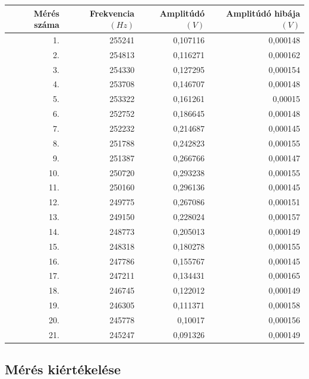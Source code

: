 \documentclass[10pt,pdftex]{report}
\begin{document}
\begin{centering}
    \centering
    \begin{tabular}{|r|r|r|r|}
        \hline
        Mérés száma & Frekvencia$(Hz)$ & Amplitúdó$(V)$ & Amplitúdó hibája$(V)$\\
        \hline
        1. & 255241 & 0,107116 & 0,000148 \\
        \hline
        2. & 254813 & 0,116271 & 0,000162 \\
        \hline
        3. & 254330 & 0,127295 & 0,000154 \\
        \hline
        4. & 253708 & 0,146707 & 0,000148 \\
        \hline
        5. & 253322 & 0,161261 & 0,00015 \\
        \hline
        6. & 252752 & 0,186645 & 0,000148 \\
        \hline
        7. & 252232 & 0,214687 & 0,000145 \\
        \hline
        8. & 251788 & 0,242823 & 0,000155 \\
        \hline
        9. & 251387 & 0,266766 & 0,000147 \\
        \hline
        10. & 250720 & 0,293238 & 0,000155 \\
        \hline
        11. & 250160 & 0,296136 & 0,000145 \\
        \hline
        12. & 249775 & 0,267086 & 0,000151 \\
        \hline
        13. & 249150 & 0,228024 & 0,000157 \\
        \hline
        14. & 248773 & 0,205013 & 0,000149 \\
        \hline
        15. & 248318 & 0,180278 & 0,000155 \\
        \hline
        16. & 247786 & 0,155767 & 0,000145 \\
        \hline
        17. & 247211 & 0,134431 & 0,000165 \\
        \hline
        18. & 246745 & 0,122012 & 0,000149 \\
        \hline
        19. & 246305 & 0,111371 & 0,000158 \\
        \hline
        20. & 245778 & 0,10017 & 0,000156 \\
        \hline
        21. & 245247 & 0,091326 & 0,000149 \\
        \hline
    \end{tabular}
\end{centering}
\subsection*{Mérés kiértékelése}
\end{document}
